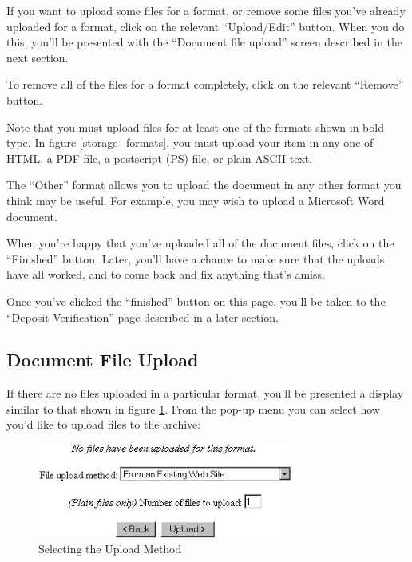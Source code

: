 If you want to upload some files for a format, or remove some files you've already uploaded for a format, click on the relevant ``Upload/Edit'' button. When you do this, you'll be presented with the ``Document file upload'' screen described in the next section.

To remove all of the files for a format completely, click on the relevant ``Remove'' button.

Note that you must upload files for at least one of the formats shown in bold type. In figure \ref{storage_formats}, you must upload your item in any one of HTML, a PDF file, a postscript (PS) file, or plain ASCII text.

The ``Other'' format allows you to upload the document in any other format you think may be useful. For example, you may wish to upload a Microsoft Word document.

When you're happy that you've uploaded all of the document files, click on the ``Finished'' button. Later, you'll have a chance to make sure that the uploads have all worked, and to come back and fix anything that's amiss.

Once you've clicked the ``finished'' button on this page, you'll be taken to the ``Deposit Verification'' page described in a later section.


\subsection{Document File Upload}

If there are no files uploaded in a particular format, you'll be presented a display similar to that shown in figure \ref{upload_method}. From the pop-up menu you can select how you'd like to upload files to the archive:

\begin{figure}
\centerline{\includegraphics[width=3.3in]{images/upload-method}}
\caption{\label{upload_method} Selecting the Upload Method}
\end{figure}

